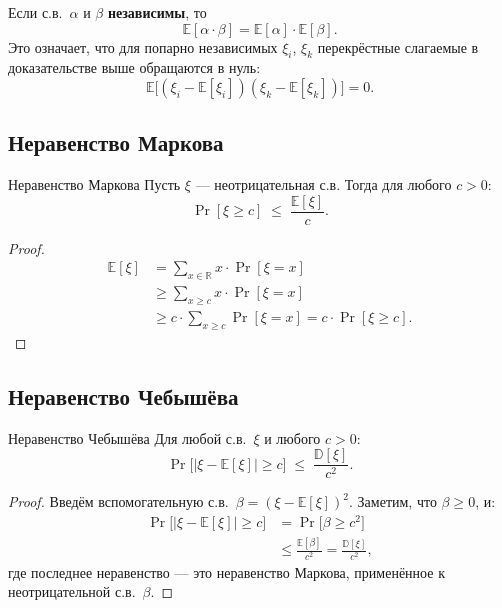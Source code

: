 \begin{Remark}{}{}
	Если с.в.\ $\alpha$ и $\beta$ \textbf{независимы}, то
	\[
	\mathbb{E}[\alpha \cdot \beta] = \mathbb{E}[\alpha] \cdot \mathbb{E}[\beta].
	\]
	Это означает, что для попарно независимых $\xi_i$, $\xi_k$ перекрёстные слагаемые в доказательстве выше обращаются в нуль:
	\[
	\mathbb{E}\bigl[(\xi_i - \mathbb{E}[\xi_i])(\xi_k - \mathbb{E}[\xi_k])\bigr] = 0.
	\]
\end{Remark}

\subsection{Неравенство Маркова}

\begin{Theorem}{Неравенство Маркова}{}
	Пусть $\xi$ — неотрицательная с.в. Тогда для любого $c > 0$:
	\[
	\Pr[\xi \geq c] \;\leq\; \frac{\mathbb{E}[\xi]}{c}.
	\]
\end{Theorem}

\begin{proof}
	\begin{align*}
		\mathbb{E}[\xi]
		&= \sum_{x \in \mathbb{R}} x \cdot \Pr[\xi = x] \\
		&\geq \sum_{x \geq c} x \cdot \Pr[\xi = x] \\
		&\geq c \cdot \sum_{x \geq c} \Pr[\xi = x]
		= c \cdot \Pr[\xi \geq c].
	\end{align*}
\end{proof}

\subsection{Неравенство Чебышёва}

\begin{Theorem}{Неравенство Чебышёва}{}
	Для любой с.в.\ $\xi$ и любого $c > 0$:
	\[
	\Pr\bigl[|\xi - \mathbb{E}[\xi]| \geq c\bigr] \;\leq\; \frac{\mathbb{D}[\xi]}{c^2}.
	\]
\end{Theorem}

	\begin{proof}
	Введём вспомогательную с.в.\ $\beta = (\xi - \mathbb{E}[\xi])^2$. Заметим, что $\beta \geq 0$, и:
	\begin{align*}
		\Pr\bigl[|\xi - \mathbb{E}[\xi]| \geq c\bigr]
		&= \Pr\bigl[\beta \geq c^2\bigr] \\
		&\leq \frac{\mathbb{E}[\beta]}{c^2}
		= \frac{\mathbb{D}[\xi]}{c^2},
	\end{align*}
	где последнее неравенство — это неравенство Маркова, применённое к неотрицательной с.в.\ $\beta$.
\end{proof}

